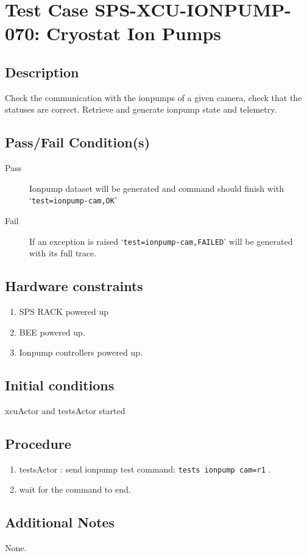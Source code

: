\section{Test Case SPS-XCU-IONPUMP-070: Cryostat Ion Pumps}

\subsection{Description}

Check the communication with the ionpumps of a given camera, check that the statuses are correct.
Retrieve and generate ionpump state and telemetry.

\subsection{Pass/Fail Condition(s)}

\begin{description}
\item [Pass] Ionpump dataset will be generated and command should finish with `\texttt{test=ionpump-cam,OK}'
\item [Fail] If an exception is raised `\texttt{test=ionpump-cam,FAILED}' will be generated with its full trace.

\end{description}

\subsection{Hardware constraints}

\begin{enumerate}
    \item SPS RACK powered up
    \item \acrshort{BEE} powered up.
    \item Ionpump controllers powered up.
\end{enumerate}

\subsection{Initial conditions}

xcuActor and testsActor started

\subsection{Procedure}

\begin{enumerate}
    \item testsActor : send ionpump test command: \texttt{tests ionpump cam=r1} .
    \item wait for the command to end.
\end{enumerate}

\subsection{Additional Notes}
None.
